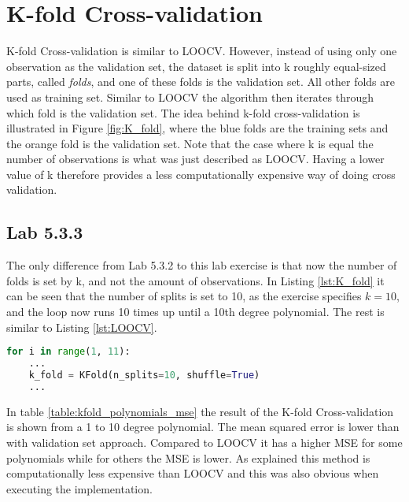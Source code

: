 \section{K-fold Cross-validation}
K-fold Cross-validation is similar to LOOCV. However, instead of using only one observation as the validation set, the dataset is split into k roughly equal-sized parts, called \emph{folds}, and one of these folds is the validation set. All other folds are used as training set. Similar to LOOCV the algorithm then iterates through which fold is the validation set. The idea behind k-fold cross-validation is illustrated in Figure \ref{fig:K_fold}, where the blue folds are the training sets and the orange fold is the validation set. Note that the case where k is equal the number of observations is what was just described as LOOCV. Having a lower value of k therefore provides a less computationally expensive way of doing cross validation.


\FloatBarrier
\subsection{Lab 5.3.3}
The only difference from Lab 5.3.2 to this lab exercise is that now the number of folds is set by k, and not the amount of observations. In Listing \ref{lst:K_fold} it can be seen that the number of splits is set to 10, as the exercise specifies $k=10$, and the loop now runs 10 times up until a 10th degree polynomial. The rest is similar to Listing \ref{lst:LOOCV}.

\begin{lstlisting}[language=Python, label=lst:K_fold, caption=K-fold Cross-validation loop]
for i in range(1, 11):
	...
	k_fold = KFold(n_splits=10, shuffle=True) 
	...
\end{lstlisting}
\FloatBarrier

In table \ref{table:kfold_polynomials_mse} the result of the K-fold Cross-validation is shown from a 1 to 10 degree polynomial. The mean squared error is lower than with validation set approach. Compared to LOOCV it has a higher MSE for some polynomials while for others the MSE is lower. As explained this method is computationally less expensive than LOOCV and this was also obvious when executing the implementation.

